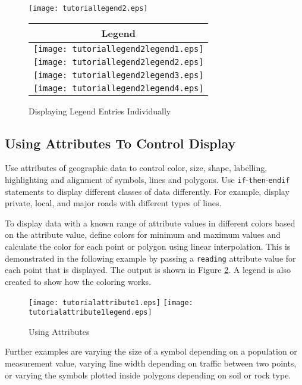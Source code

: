 \begin{figure}[h]
\texttt{[image: tutoriallegend2.eps]}

\begin{tabular}{|c|}
\hline
Legend \\
\hline
\texttt{[image: tutoriallegend2legend1.eps]} \\
\hline
\texttt{[image: tutoriallegend2legend2.eps]} \\
\hline
\texttt{[image: tutoriallegend2legend3.eps]} \\
\hline
\texttt{[image: tutoriallegend2legend4.eps]} \\
\hline
\end{tabular}

\caption{Displaying Legend Entries Individually}
\label{tutoriallegend2}
\end{figure}

\subsection{Using Attributes To Control Display}

Use attributes of geographic data to control
color, size, shape, labelling, highlighting and alignment of symbols, lines
and polygons.
Use \texttt{if}-\texttt{then}-\texttt{endif}
statements to display different classes of data
differently.  For example, display private, local, and major roads
with different types of lines.

To display data with a known range of attribute values in different
colors based on the attribute value, define colors for minimum and
maximum values and calculate the color for each point or polygon
using linear interpolation.  This is demonstrated in the following
example by passing a \texttt{reading} attribute value for each point
that is displayed.  The output is shown in Figure \ref{tutorialattribute1}.
A legend is also created to show how the coloring works.



\begin{figure}[h]
\texttt{[image: tutorialattribute1.eps]}
\texttt{[image: tutorialattribute1legend.eps]}
\caption{Using Attributes}
\label{tutorialattribute1}
\end{figure}

Further examples are varying the size of a symbol depending on a
population or measurement value, varying line width depending on
traffic between two points, or varying the symbols plotted inside
polygons depending on soil or rock type.

